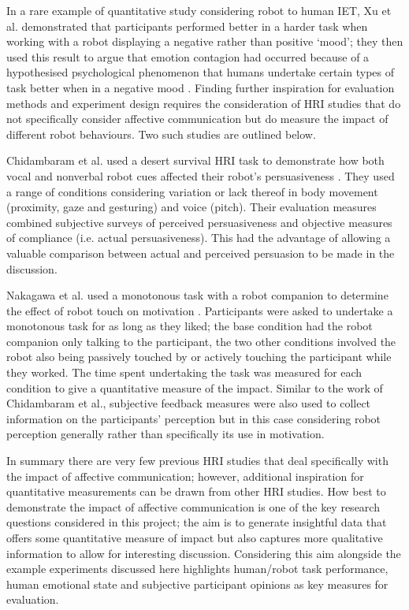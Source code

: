 \documentclass[11pt,a4paper]{report}
\begin{document}
In a rare example of quantitative study considering robot to human IET, Xu et al. demonstrated that participants performed better in a harder task when working with a robot displaying a negative rather than positive `mood'; they then used this result to argue that emotion contagion had occurred because of a hypothesised psychological phenomenon that humans undertake certain types of task better when in a negative mood \cite{xu2014robot}. Finding further inspiration for evaluation methods and experiment design requires the consideration of HRI studies that do not specifically consider affective communication but do measure the impact of different robot behaviours. Two such studies are outlined below.

Chidambaram et al. used a desert survival HRI task to demonstrate how both vocal and nonverbal robot cues affected their robot's persuasiveness \cite{chidambaram2012designing}. They used a range of conditions considering variation or lack thereof in body movement (proximity, gaze and gesturing) and voice (pitch). Their evaluation measures combined subjective surveys of perceived persuasiveness and objective measures of compliance (i.e. actual persuasiveness). This had the advantage of allowing a valuable comparison between actual and perceived persuasion to be made in the discussion. 

Nakagawa et al. used a monotonous task with a robot companion to determine the effect of robot touch on motivation \cite{nakagawa2011effect}. Participants were asked to undertake a monotonous task for as long as they liked; the base condition had the robot companion only talking to the participant, the two other conditions involved the robot also being passively touched by or actively touching the participant while they worked. The time spent undertaking the task was measured for each condition to give a quantitative measure of the impact. Similar to the work of Chidambaram et al., subjective feedback measures were also used to collect information on the participants' perception but in this case considering robot perception generally rather than specifically its use in motivation. 

In summary there are very few previous HRI studies that deal specifically with the impact of affective communication; however, additional inspiration for quantitative measurements can be drawn from other HRI studies. How best to demonstrate the impact of affective communication is one of the key research questions considered in this project; the aim is to generate insightful data that offers some quantitative measure of impact but also captures more qualitative information to allow for interesting discussion. Considering this aim alongside the example experiments discussed here highlights human/robot task performance, human emotional state and subjective participant opinions as key measures for evaluation.



\end{document}
